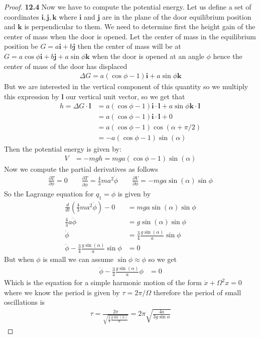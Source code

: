 \documentclass[11pt]{article}
\theoremstyle{definition}
\begin{document}
\begin{proof}{\textbf{12.4}}
    Now we have to compute the potential energy. Let us define a set of
    coordinates $\bm{i},\bm{j},\bm{k}$ where $\bm{i}$ and $\bm{j}$ are in the
    plane of the door equilibrium position and $\bm{k}$ is perpendicular to
    them. We need to determine first the height gain of the center of mass
    when the door is opened.
    Let the center of mass in the equilibrium position be
    $G = a \bm{i} + b\bm{j}$ then the center of mass will be at
    $G = a\cos\phi\bm{i} + b\bm{j} + a\sin\phi \bm{k}$ when
    the door is opened at an angle $\phi$ hence the center of mass of the door
    has displaced
    \begin{align*}
        \Delta G = a(\cos\phi - 1) \bm{i} + a\sin\phi \bm{k}
    \end{align*}
    But we are interested in the vertical component of this quantity  so we
    multiply this expression by $\bm{l}$ our vertical unit vector, so we get
    that
    \begin{align*}
        h = \Delta G\cdot\bm{l} &= a(\cos\phi - 1) \bm{i}\cdot \bm{l}
        + a\sin\phi \bm{k} \cdot \bm{l}\\
        &= a(\cos\phi - 1) \bm{i}\cdot \bm{l} + 0\\
        &= a(\cos\phi - 1) \cos(\alpha + \pi/2)\\
        &= -a(\cos\phi - 1) \sin(\alpha)
    \end{align*}
    Then the potential energy is given by:
    \begin{align*}
        V &= -mgh = mga(\cos\phi - 1) \sin(\alpha)
    \end{align*}
    Now we compute the partial derivatives as follows
    \begin{align*}
        \frac{\partial T}{\partial \phi} = 0\quad\quad
        \frac{\partial T}{\partial \dot \phi} = \frac{4}{3}ma^2 \dot\phi\quad\quad
        \frac{\partial V}{\partial \phi} = -mga\sin(\alpha)\sin\phi
    \end{align*}
    So the Lagrange equation for $q_1 = \phi$ is given by
    \begin{align*}
        \frac{d}{dt}(\frac{4}{3}ma^2 \dot\phi) - 0 &= mga\sin(\alpha)\sin\phi\\
        \frac{4}{3}a\ddot\phi &= g\sin(\alpha)\sin\phi\\
        \ddot\phi &= \frac{3}{4}\frac{g\sin(\alpha)}{a}\sin\phi\\
        \ddot\phi - \frac{3}{4}\frac{g\sin(\alpha)}{a}\sin\phi &= 0
    \end{align*}
    But when $\phi$ is small we can assume $\sin\phi \approx \phi$ so we get
    \begin{align*}
        \ddot\phi - \frac{3}{4}\frac{g\sin(\alpha)}{a}\phi &= 0
    \end{align*}
    Which is the equation for a simple harmonic motion of the form
    $\ddot{x} + \Omega^2 x =0$ where we know the period
    is given by $\tau = 2\pi / \Omega$ therefore
    the period of small oscillations is
    \begin{align*}
        \tau = \frac{2\pi}{\sqrt{\frac{3}{4}\frac{g\sin(\alpha)}{a}}} 
        = 2\pi \sqrt{\frac{4a}{3g \sin \alpha}}
    \end{align*}
\end{proof}
\end{document}
